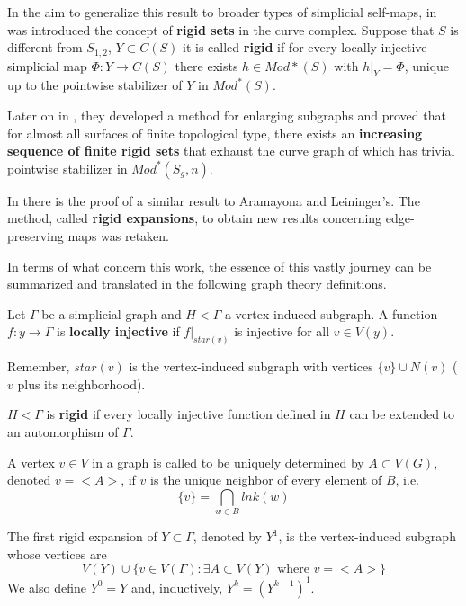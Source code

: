 In the aim to generalize this result to broader types of simplicial self-maps, in \cite[Aramayona, Leininger - 13]{finiteRigidSetsJA} was introduced the concept of \textbf{rigid sets} in the curve complex. Suppose that $S$ is different from $S_{1,2}$,  $Y \subset C(S)$ it is called \textbf{rigid} if for every locally injective simplicial map $\Phi  : Y \to C(S)$ there exists $h \in Mod{\ast}(S)$ with $h|_{Y} = \Phi$, unique up to the pointwise stabilizer of $Y$ in $Mod^{\ast}(S)$.

Later on in \cite[Aramayona, Leininger - 13]{exhaustionByRigidSets}, they developed a method for enlarging subgraphs and proved that for almost all surfaces of finite topological type, there exists an \textbf{increasing sequence of finite rigid sets} that exhaust the curve graph of which has trivial pointwise stabilizer in $Mod^{\ast}(S_{g},n)$.

In \cite[J. Hernández]{exhaustionCurveGraph} there is the proof of a similar result to Aramayona and Leininger's. The method,  called \textbf{rigid expansions}, to obtain new results concerning edge-preserving maps was retaken. 

In terms of what concern this work, the essence of this vastly journey can be summarized and translated in the following graph theory definitions.

\begin{defini}
Let $\Gamma$ be a simplicial graph and $H<\Gamma$ a vertex-induced subgraph. A function $f:y\to \Gamma$ is \textbf{locally injective} if $f|_{star(v)}$ is injective for all $v \in V(y)$. 
\end{defini}

\begin{nota}
Remember, $star(v)$ is the vertex-induced subgraph with vertices $\{ v \} \cup N(v)$ ($v$ plus its neighborhood).
\end{nota}

\begin{defini}
$H<\Gamma$ is \textbf{rigid} if every locally injective function defined in $H$ can be extended to an automorphism of $\Gamma$. \end{defini}

A vertex $v \in V$ in a graph is called to be uniquely determined by $A\subset V(G)$, denoted $v=<A>$, if $v$ is the unique neighbor of every element of $B$, i.e.
$$ \{ v \} = \bigcap_{w\in B} lnk(w) $$
\begin{defini}
The first rigid expansion of $Y\subset \Gamma$, denoted by $Y^{1}$, is the vertex-induced subgraph whose vertices are
$$ V(Y) \cup \{ v\in V(\Gamma) :  \exists A \subset V(Y) \text{ where } v = <A>  \}$$
We also define $Y^{0} = Y$ and, inductively, $Y^{k} = (Y^{k-1})^{1}$.
\end{defini}

